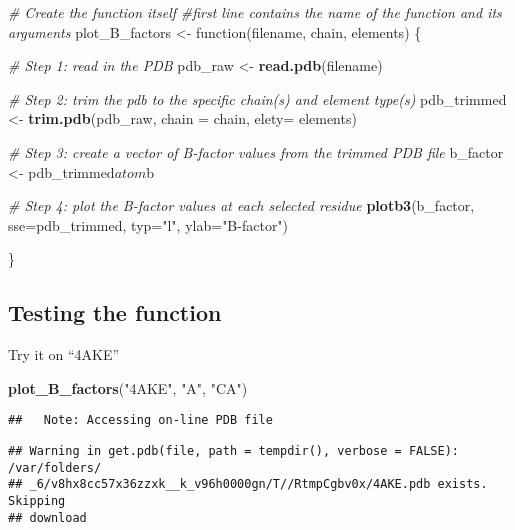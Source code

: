 \documentclass[]{article}
\newenvironment{Shaded}{\begin{snugshade}}{\end{snugshade}}
\newcommand{\KeywordTok}[1]{\textcolor[rgb]{0.13,0.29,0.53}{\textbf{{#1}}}}
\newcommand{\DataTypeTok}[1]{\textcolor[rgb]{0.13,0.29,0.53}{{#1}}}
\newcommand{\StringTok}[1]{\textcolor[rgb]{0.31,0.60,0.02}{{#1}}}
\newcommand{\CommentTok}[1]{\textcolor[rgb]{0.56,0.35,0.01}{\textit{{#1}}}}
\newcommand{\NormalTok}[1]{{#1}}
\begin{document}
\begin{Shaded}
\begin{Highlighting}[]
\CommentTok{# Create the function itself}
\CommentTok{#first line contains the name of the function and its arguments}
\NormalTok{plot_B_factors <-}\StringTok{ }\NormalTok{function(filename, chain, elements) \{}
  
  \CommentTok{# Step 1: read in the PDB}
  \NormalTok{pdb_raw <-}\StringTok{ }\KeywordTok{read.pdb}\NormalTok{(filename)}
  
  \CommentTok{# Step 2: trim the pdb to the specific chain(s) and element type(s)}
  \NormalTok{pdb_trimmed <-}\StringTok{ }\KeywordTok{trim.pdb}\NormalTok{(pdb_raw, }\DataTypeTok{chain =} \NormalTok{chain, }\DataTypeTok{elety=} \NormalTok{elements)}
  
  \CommentTok{# Step 3: create a vector of B-factor values from the trimmed PDB file}
  \NormalTok{b_factor <-}\StringTok{ }\NormalTok{pdb_trimmed$atom$b}
  
  \CommentTok{# Step 4: plot the B-factor values at each selected residue}
  \KeywordTok{plotb3}\NormalTok{(b_factor, }\DataTypeTok{sse=}\NormalTok{pdb_trimmed, }\DataTypeTok{typ=}\StringTok{"l"}\NormalTok{, }\DataTypeTok{ylab=}\StringTok{"B-factor"}\NormalTok{)}
  
\NormalTok{\}}
\end{Highlighting}
\end{Shaded}

\subsection{Testing the function}\label{testing-the-function}

Try it on ``4AKE''

\begin{Shaded}
\begin{Highlighting}[]
\KeywordTok{plot_B_factors}\NormalTok{(}\StringTok{"4AKE"}\NormalTok{, }\StringTok{"A"}\NormalTok{, }\StringTok{"CA"}\NormalTok{)}
\end{Highlighting}
\end{Shaded}

\begin{verbatim}
##   Note: Accessing on-line PDB file
\end{verbatim}

\begin{verbatim}
## Warning in get.pdb(file, path = tempdir(), verbose = FALSE): /var/folders/
## _6/v8hx8cc57x36zzxk__k_v96h0000gn/T//RtmpCgbv0x/4AKE.pdb exists. Skipping
## download
\end{verbatim}
\end{document}
